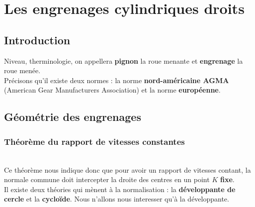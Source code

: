 \section{Les engrenages cylindriques droits}
\subsection{Introduction}
Niveau, therminologie, on appellera \textbf{pignon} la roue menante et \textbf{engrenage} la roue menée. \\
Précisons qu'il existe deux normes : la norme \textbf{nord-américaine AGMA} (American Gear Manufacturers Association) et la norme \textbf{européenne}. 
	
\subsection{Géométrie des engrenages}
\subsubsection{Théorème du rapport de vitesses constantes}
\ \\
Ce théorème nous indique donc que pour avoir un rapport de vitesses contant, la normale commune doit intercepter la droite des centres en un point $K$ \textbf{fixe}. \\
Il existe deux théories qui mènent à la normalisation : la \textbf{développante de cercle} et la \textbf{cycloïde}. Nous n'allons nous interesser qu'à la développante.
	
\newpage	
	

